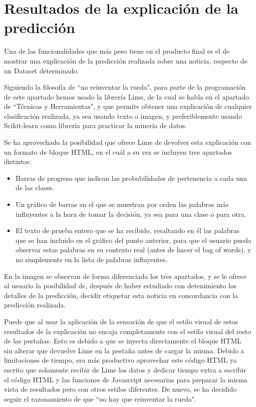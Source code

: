 \section{Resultados de la explicación de la predicción}

Una de las funcionalidades que más peso tiene en el producto final es el de mostrar una explicación de la predicción realizada sobre una noticia, respecto de un Dataset determinado. 

Siguiendo la filosofía de ``no reinventar la rueda", para parte de la programación de este apartado hemos usado la librería Lime, de la cual se habla en el apartado de ``Técnicas y Herramientas", y que permite obtener una explicación de cualquier clasificación realizada, ya sea usando texto o imagen, y preferiblemente usando Scikit-learn como librería para practicar la minería de datos.

Se ha aprovechado la posibilidad que ofrece Lime de devolver esta explicación con un formato de bloque HTML, en el cuál a su vez se incluyen tres apartados distintos:

\begin{itemize}

\item Barras de progreso que indican las probabilidades de pertenencia a cada una de las clases.

\item Un gráfico de barras en el que se muestran por orden las palabras más influyentes a la hora de tomar la decisión, ya sea para una clase o para otra.

\item El texto de prueba entero que se ha recibido, resaltando en él las palabras que se han incluido en el gráfico del punto anterior, para que el usuario pueda observar estas palabras en su contexto real (antes de hacer el bag of words), y no simplemente en la lista de palabras influyentes.

\end{itemize}


En la imagen se observan de forma diferenciada los tres apartados, y se le ofrece al usuario la posibilidad de, después de haber estudiado con detenimiento los detalles de la predicción, decidir etiquetar esta noticia en concordancia con la predicción realizada.

Puede que al usar la aplicación de la sensación de que el estilo visual de estos resultados de la explicación no encaja completamente con el estilo visual del resto de las pestañas. Esto es debido a que se inyecta directamente el bloque HTML sin alterar que devuelve Lime en la pestaña antes de cargar la misma. Debido a limitaciones de tiempo, era más productivo aprovechar este código HTML ya escrito que solamente recibir de Lime los datos y dedicar tiempo extra a escribir el código HTML y las funciones de Javascript necesarias para preparar la misma vista de resultados pero con otros estilos diferentes. De nuevo, se ha decidido seguir el razonamiento de que ``no hay que reinventar la rueda".

